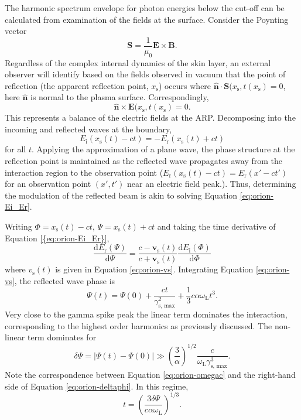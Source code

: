 The harmonic spectrum envelope for photon energies below the cut-off can be calculated from examination of the fields at the surface. Consider the Poynting vector
\begin{equation}
	\mathbf{S} = \frac{1}{\mu_0}\mathbf{E}\times\mathbf{B}.
\end{equation}
Regardless of the complex internal dynamics of the skin layer, an external observer will identify based on the fields observed in vacuum that the point of reflection (the apparent reflection point, $x_\mathrm{s}$) occurs where $\hat{\mathbf{n}}\cdot\mathbf{S}(x_\mathrm{s},t(x_\mathrm{s}) = 0$, here $\hat{\mathbf{n}}$ is normal to the plasma surface. Correspondingly,
\begin{equation}
	\hat{\mathbf{n}}\times \mathbf{E}(x_\mathrm{s},t(x_\mathrm{s}) = 0.
\end{equation}
This represents a balance of the electric fields at the ARP. Decomposing into the incoming and reflected waves at the boundary,
\begin{equation}\label{eq:orion-Ei_Er}
	E_\mathrm{i}(x_\mathrm{s}(t) - ct) = - E_\mathrm{r}(x_\mathrm{s}(t) + ct)
\end{equation}
for all $t$. Applying the approximation of a plane wave, the phase structure at the reflection point is maintained as the reflected wave propagates away from the interaction region to the observation point ($E_\mathrm{r}(x_\mathrm{s}(t) - ct) = E_\mathrm{r}(x' - ct')$ for an observation point $(x',t')$ near an electric field peak.). Thus, determining the modulation of the reflected beam is akin to solving Equation \ref{eq:orion-Ei_Er}. 

Writing $\Phi = x_\mathrm{s}(t) - ct$, $\Psi = x_\mathrm{s}(t) + ct$ and taking the time derivative of Equation \ref{{eq:orion-Ei_Er}},
\begin{equation}
	\frac{\mathrm{d}E_\mathrm{r}(\Psi)}{\mathrm{d}\Psi} = \frac{c - \mathbf{v}_\mathrm{s}(t)}{c+\mathbf{v}_\mathrm{s}(t)}\frac{\mathrm{d}E_\mathrm{i}(\Phi)}{\mathrm{d}\Phi}
\end{equation}
where $v_\mathrm{s}(t)$ is given in Equation \ref{eq:orion-vs}. Integrating Equation \ref{eq:orion-vs}, the reflected wave phase is
\begin{equation}
	\Psi(t) = \Psi(0) + \frac{ct}{\gamma_\mathrm{s,\, max}^2} + \frac{1}{3}c\alpha \omega_\mathrm{L}t^3.
\end{equation}
Very close to the gamma spike peak the linear term dominates the interaction, corresponding to the highest order harmonics as previously discussed. The non-linear term dominates for 
\begin{equation}\label{eq:orion-deltaphi}
	\delta \Psi = |\Psi(t) - \Psi(0)| \gg \left(\frac{3}{\alpha}\right)^{1/2}\frac{c}{\omega_\mathrm{L}\gamma_\mathrm{s,\, max}^3}.
\end{equation}
Note the correspondence between Equation \ref{eq:orion-omegac} and the right-hand side of Equation \ref{eq:orion-deltaphi}. In this regime,
\begin{equation}
	t = \left(\frac{3\delta \Psi }{c\alpha \omega_\mathrm{L}}\right)^{1/3}.
\end{equation}

